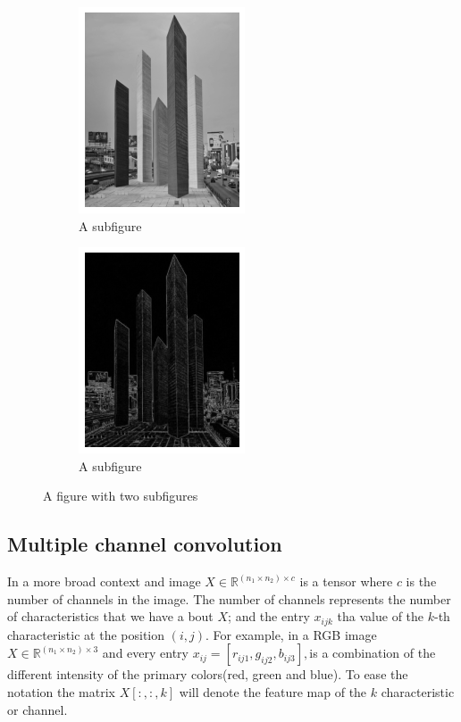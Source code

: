 \documentclass{article}
\theoremstyle{definition}
\begin{document}
\begin{figure}[H]
\centering
\begin{subfigure}{.5\textwidth}
  \centering
  \includegraphics[width=.5\linewidth]{Imagenes/satelite.png}
  \caption{A subfigure}
  \label{fig:sub1}
\end{subfigure}%
\begin{subfigure}{.5\textwidth}
  \centering
  \includegraphics[width=.5\linewidth]{Imagenes/satelite_outline.png}
  \caption{A subfigure}
  \label{fig:sub2}
\end{subfigure}
\caption{A figure with two subfigures}
\label{fig:test}
\end{figure}

\subsection{Multiple channel convolution}
In a more broad context and image $X\in\mathbb{R}^{(n_1\times n_2)\times c}$ is a tensor where $c$ is the number of channels in the image. The number of channels represents the number of characteristics that we have a bout $X$; and the entry $x_{ijk}$ tha value of the $k$-th characteristic at the position $(i,j)$. For example, in a RGB image  $X\in\mathbb{R}^{(n_1\times n_2)\times 3}$ and every entry $x_{ij}=[r_{ij1},g_{ij2},b_{ij3}],$is a combination of the different intensity of the primary colors(red, green and blue). To ease the notation the matrix $X[:,:,k]$ will denote the feature map of the $k$ characteristic or channel.
\end{document}
